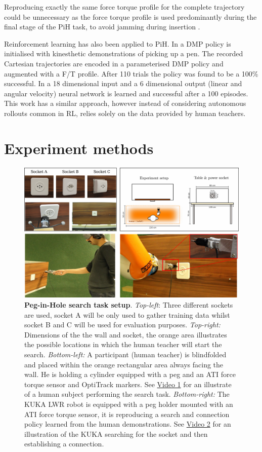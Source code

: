 \documentclass[final,5p,times,twocolumn]{elsarticle}
\begin{document}
Reproducing exactly the same force torque profile for the complete trajectory could be 
unnecessary as the force torque profile is used predominantly during the final stage of the PiH task, 
to avoid jamming during insertion \cite[Chap. 5]{Kronander2015}. 

Reinforcement learning has also been applied to PiH. In \cite{learn_force_c_icirs_2011} a DMP policy is 
initialised with kinesthetic demonstrations of picking up a pen. The recorded Cartesian 
trajectories are encoded in a parameterised DMP policy and augmented with a F/T profile. 
After 110 trials the policy was found to be a 100\% successful. In \cite{learn_admittance_icra_1994} a 18 dimensional input 
and a 6 dimensional output (linear and angular velocity) neural network is learned and successful after a 100 episodes. 
This work has a similar approach, however instead of considering autonomous rollouts common in RL, 
relies solely on the data provided by human teachers.


\section{Experiment methods}\label{sec:experiment_methods}

\begin{figure}
 \centering
 \includegraphics[width=0.85\linewidth]{./Figure/Figure1.pdf}
 \caption{\textbf{Peg-in-Hole search task setup}.
  \textit{Top-left}: Three different sockets are used, socket A will be only used to gather training data whilst socket B and 
  C will be used for evaluation purposes.  \textit{Top-right:} Dimensions of the the wall and socket, the orange area illustrates the possible locations 
  in which the human teacher will start the search.
  \textit{Bottom-left:} A participant (human teacher) is blindfolded and  placed within the orange rectangular area always 
  facing the wall. He is holding a cylinder equipped with a peg and an  ATI force torque sensor and OptiTrack markers. See \href{http://lasa.epfl.ch/videos/gpldecha/pih-search/human_search.wmv}{Video 1} for 
  an illustrate of a human subject performing the search task.
  \textit{Bottom-right:} The KUKA LWR robot is equipped with a peg holder mounted with an ATI force torque sensor, it is reproducing a search 
  and connection policy learned from the human demonstrations. See \href{http://lasa.epfl.ch/videos/gpldecha/pih-search/KUKA_pih-search.wmv}{Video 2} for an illustration of the KUKA searching for the socket and then 
  establishing a connection.}
    \label{fig:search_task_setup}
\end{figure}
\end{document}

